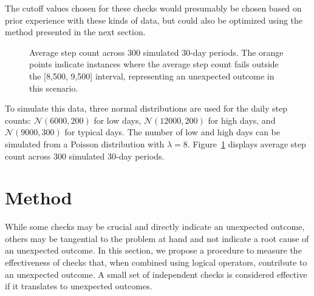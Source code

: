 \documentclass[
  12pt,
]{interact}
\begin{document}
The cutoff values chosen for these checks would presumably be chosen
based on prior experience with these kinds of data, but could also be
optimized using the method presented in the next section.

\label{cell-fig-step-count}
\begin{figure}[H]


\caption{\label{fig-step-count}Average step count across 300 simulated
30-day periods. The orange points indicate instances where the average
step count fails outside the {[}8,500, 9,500{]} interval, representing
an unexpected outcome in this scenario.}

\end{figure}%

To simulate this data, three normal distributions are used for the daily
step counts: \(\mathcal{N}(6000, 200)\) for low days,
\(\mathcal{N}(12000, 200)\) for high days, and
\(\mathcal{N}(9000, 300)\) for typical days. The number of low and high
days can be simulated from a Poisson distribution with \(\lambda = 8\).
Figure~\ref{fig-step-count} displays average step count across 300
simulated 30-day periods.

\section{Method}\label{sec-method}

While some checks may be crucial and directly indicate an unexpected
outcome, others may be tangential to the problem at hand and not
indicate a root cause of an unexpected outcome. In this section, we
propose a procedure to measure the effectiveness of checks that, when
combined using logical operators, contribute to an unexpected outcome. A
small set of independent checks is considered effective if it translates
to unexpected outcomes.
\end{document}

